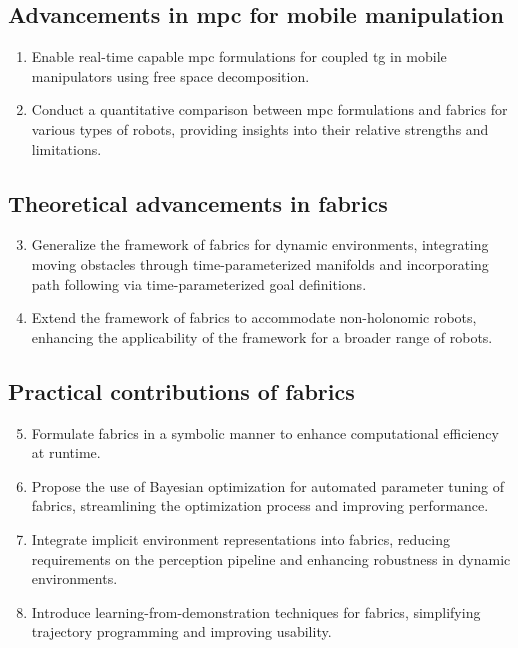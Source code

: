 \subsection{Advancements in \ac{mpc} for mobile manipulation}
\begin{enumerate}
    \item Enable real-time capable \ac{mpc} formulations for
      coupled \ac{tg} in mobile manipulators
      using free space decomposition.
    \item Conduct a quantitative comparison between \ac{mpc}
      formulations and \ac{fabrics} for various types of
      robots, providing insights into their relative
      strengths and limitations.
\end{enumerate}

\subsection{Theoretical advancements in \ac{fabrics}}
\begin{enumerate}
    \setcounter{enumi}{2}
    \item Generalize the framework of \ac{fabrics}
      for dynamic environments, integrating moving obstacles
      through time-parameterized manifolds and incorporating
      path following via time-parameterized goal
      definitions.
    \item Extend the framework of \ac{fabrics} to
      accommodate non-holonomic robots, enhancing the
      applicability of the framework for a broader range of
      robots.
\end{enumerate}

\subsection{Practical contributions of \ac{fabrics}}
\begin{enumerate}
    \setcounter{enumi}{4}
    \item Formulate \ac{fabrics} in a symbolic
      manner to enhance computational efficiency at runtime.
    \item Propose the use of Bayesian optimization for
      automated parameter tuning of \ac{fabrics},
      streamlining the optimization process and improving
      performance.
    \item Integrate implicit environment representations
      into \ac{fabrics}, reducing requirements on
      the perception pipeline and enhancing robustness in
      dynamic environments.
    \item Introduce learning-from-demonstration techniques
      for \ac{fabrics}, simplifying trajectory
      programming and improving usability.
\end{enumerate}

